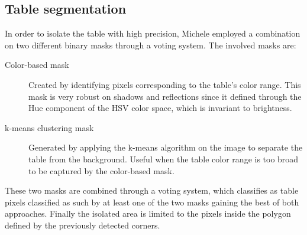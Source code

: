 \subsection{Table segmentation}
In order to isolate the table with high precision, Michele employed a combination on two different binary masks through a voting system.
The involved masks are:
\begin{description}
	\item[Color-based mask] Created by identifying pixels corresponding to the table's color range. This mask is very robust on shadows and reflections since it defined through the Hue component of the HSV color space, which is invariant to brightness.
	\item[k-means clustering mask] Generated by applying the k-means algorithm on the image to separate the table from the background. Useful when the table color range is too broad to be captured by the color-based mask.
\end{description}
These two masks are combined through a voting system, which classifies as table pixels classified as such by at least one of the two masks gaining the best of both approaches.
Finally the isolated area is limited to the pixels inside the polygon defined by the previously detected corners.
